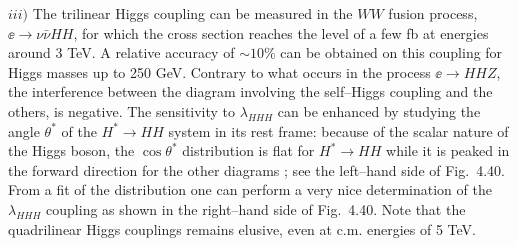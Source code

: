 $iii)$ The trilinear Higgs coupling can be measured in the $WW$ fusion process,
$\ee \to \nu \bar{\nu}HH$, for which the cross section reaches the level of a
few fb at energies around 3 TeV. A relative accuracy of $\sim 10\%$ can be
obtained on this coupling for Higgs masses up to 250 GeV. Contrary to what 
occurs in the process $\ee \to
HHZ$, the interference between the diagram involving the self--Higgs coupling
and the others, is negative.  The sensitivity to $\lambda_{HHH}$ can be
enhanced by studying the angle $\theta^*$ of the $H^* \to HH$ system
in its rest frame: because of the scalar nature of the Higgs boson, the $\cos 
\theta^*$ distribution is flat for $H^* \rightarrow HH$ while it is peaked in 
the forward direction for the other diagrams \cite{gam-WWHH}; see the 
left--hand side of Fig.~4.40. From a fit of the distribution one can perform
a very nice determination of the $\lambda_{HHH}$
coupling as shown in the right--hand side of Fig.~4.40.  Note that the
quadrilinear Higgs couplings remains elusive, even at c.m.  energies of 5 TeV.
\s


